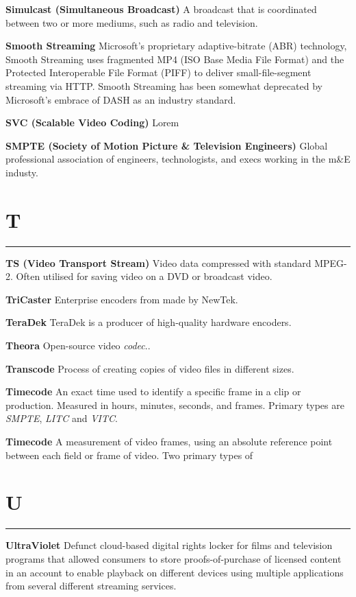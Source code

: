 \smallskip
\textbf{Simulcast (Simultaneous Broadcast)}
A broadcast that is coordinated between two or more mediums, such as radio and television.

\smallskip
\textbf{Smooth Streaming}
Microsoft’s proprietary adaptive-bitrate (ABR) technology, Smooth Streaming uses fragmented MP4 (ISO Base Media File Format) and the Protected Interoperable File Format (PIFF) to deliver small-file-segment streaming via HTTP. Smooth Streaming has been somewhat deprecated by Microsoft’s embrace of DASH as an industry standard.

\smallskip
\textbf{SVC (Scalable Video Coding)}
Lorem

\smallskip
\textbf{SMPTE (Society of Motion Picture \& Television Engineers)}
Global professional association of engineers, technologists, and execs working in the m\&E industy.


\section{T}
\hrule

\smallskip
\textbf{TS (Video Transport Stream)}
Video data compressed with standard MPEG-2. Often utilised for saving video on a DVD or broadcast video.


\smallskip
\textbf{TriCaster}
Enterprise encoders from made by NewTek.

\smallskip
\textbf{TeraDek}
TeraDek is a producer of high-quality hardware encoders.


\smallskip
\textbf{Theora}
Open-source video \textit{codec}..

\smallskip
\textbf{Transcode}
Process of creating copies of video files in different sizes.

\smallskip
\textbf{Timecode}
An exact time used to identify a specific frame in a clip or production. Measured in hours, minutes, seconds, and frames. Primary types are \textit{SMPTE}, \textit{LITC} and \textit{VITC}.

\smallskip
\textbf{Timecode}
A measurement of video frames, using an absolute reference point between each field or frame of video. Two primary types of

\section{U}
\hrule

\smallskip
\textbf{UltraViolet}
Defunct cloud-based digital rights locker for films and television programs that allowed consumers to store proofs-of-purchase of licensed content in an account to enable playback on different devices using multiple applications from several different streaming services.

